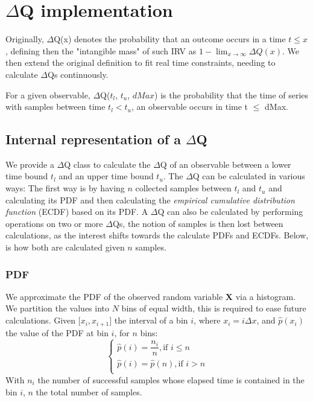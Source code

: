 \section{$\Delta$Q implementation}

Originally, $\Delta$Q(x) denotes the probability that an outcome occurs in a time $t \le x$, defining then the "intangible mass" of such IRV as $1 - \lim_{x\to\infty} \Delta Q (x)$.
We then extend the original definition to fit real time constraints, needing to calculate $\Delta$Qs continuously.

For a given observable, $\Delta$Q($t_l$, $t_u$, $dMax$) is the probability that the time of series with samples between time $t_l < t_u$, an observable occurs in time t $\le$ dMax.


\subsection{Internal representation of a $\Delta$Q}
    We provide a $\Delta$Q class to calculate the $\Delta$Q of an observable between a lower time bound $t_l$ and an upper time bound $t_u$.
    The $\Delta$Q can be calculated in various ways: 
    The first way is by having $n$ collected samples between $t_l$ and $t_u$ and calculating its PDF and then calculating the \textit{empirical cumulative distribution function} (ECDF) based on its PDF.
    A $\Delta$Q can also be calculated by performing operations on two or more $\Delta$Qs, the notion of samples is then lost between calculations, as the interest shifts towards the calculate PDFs and ECDFs.
    Below, is how both are calculated given $n$ samples.
    \subsubsection{PDF}
  We approximate the PDF of the observed random variable $\textbf{X}$ via a histogram. We partition the values into $N$ bins of equal width, this is required to ease future calculations.
        Given $\lbrack x_i, x_{i+1} \rbrack$ the interval of a bin $i$, where $x_i = i\Delta x$, and $\hat{p}(x_i)$ the value of the PDF at bin $i$, for $n$ bins:
        \begin{equation}
            \begin{cases}
                \hat{p}(i) = \dfrac{n_i}{n}, \text{if } i \le n \\
                \hat{p}(i) = \hat{p}(n), \text{if } i > n \\
            \end{cases}
            \label{eq:pdf}
        \end{equation}
   With $n_i$ the number of successful samples whose elapsed time is contained in the bin $i$, $n$ the total number of samples.
